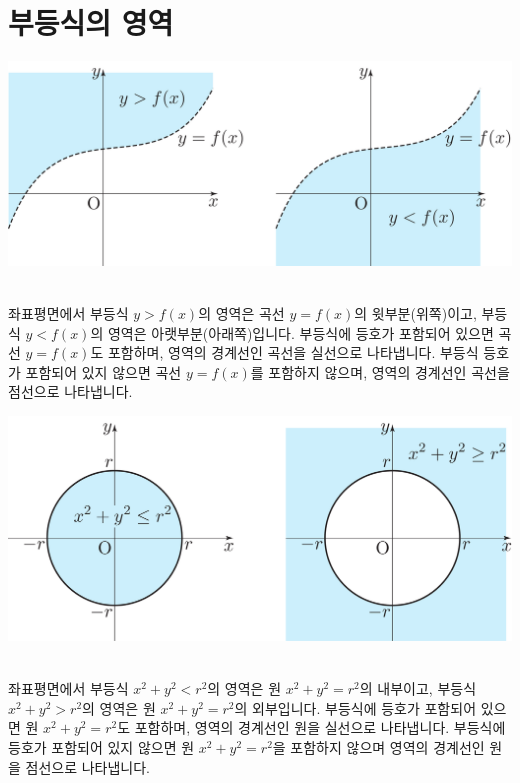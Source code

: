 \section{부등식의 영역}\begin{center}
\includegraphics[scale=0.115]{pic0/pic151.pdf}\
\end{center}좌표평면에서 부등식 $y>f(x)$의 영역은 곡선 $y=f(x)$의 윗부분(위쪽)이고, 부등식 $y<f(x)$의 영역은 아랫부분(아래쪽)입니다. 부등식에 등호가 포함되어 있으면 곡선 $y=f(x)$도 포함하며, 영역의 경계선인 곡선을 실선으로 나타냅니다. 부등식 등호가 포함되어 있지 않으면 곡선 $y=f(x)$를 포함하지 않으며, 영역의 경계선인 곡선을 점선으로 나타냅니다.
\begin{center}
\includegraphics[scale=0.115]{pic0/pic152.pdf}\
\end{center}좌표평면에서 부등식 $x^2 + y^2 < r^2$의 영역은 원 $x^2 + y^2 = r^2$의 내부이고, 부등식 $x^2 + y^2 > r^2$의 영역은 원 $x^2 + y^2 = r^2$의 외부입니다.  부등식에 등호가 포함되어 있으면 원 $x^2 + y^2 = r^2$도 포함하며, 영역의 경계선인 원을 실선으로 나타냅니다. 부등식에 등호가 포함되어 있지 않으면 원 $x^2 + y^2 = r^2$을 포함하지 않으며 영역의 경계선인 원을 점선으로 나타냅니다.
